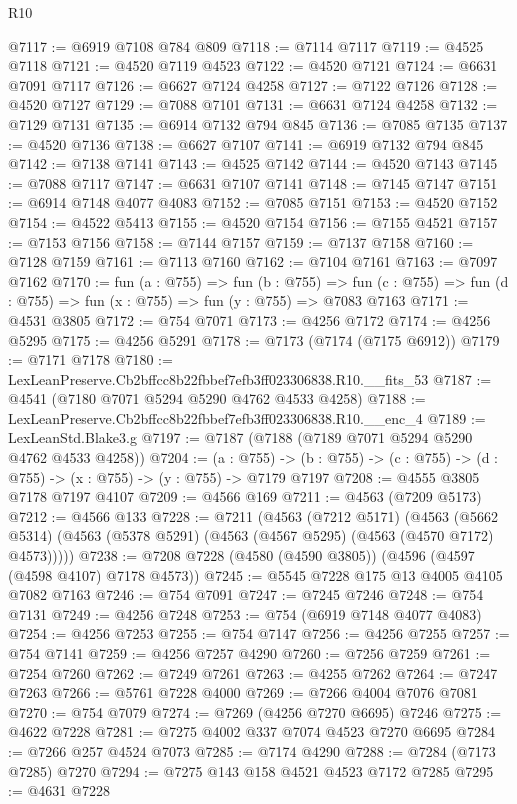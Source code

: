 \begin{lexlean}{R10}
\begin{coremodule}
@7117 := @6919 @7108 @784 @809
@7118 := @7114 @7117
@7119 := @4525 @7118
@7121 := @4520 @7119 @4523
@7122 := @4520 @7121
@7124 := @6631 @7091 @7117
@7126 := @6627 @7124 @4258
@7127 := @7122 @7126
@7128 := @4520 @7127
@7129 := @7088 @7101
@7131 := @6631 @7124 @4258
@7132 := @7129 @7131
@7135 := @6914 @7132 @794 @845
@7136 := @7085 @7135
@7137 := @4520 @7136
@7138 := @6627 @7107
@7141 := @6919 @7132 @794 @845
@7142 := @7138 @7141
@7143 := @4525 @7142
@7144 := @4520 @7143
@7145 := @7088 @7117
@7147 := @6631 @7107 @7141
@7148 := @7145 @7147
@7151 := @6914 @7148 @4077 @4083
@7152 := @7085 @7151
@7153 := @4520 @7152
@7154 := @4522 @5413
@7155 := @4520 @7154
@7156 := @7155 @4521
@7157 := @7153 @7156
@7158 := @7144 @7157
@7159 := @7137 @7158
@7160 := @7128 @7159
@7161 := @7113 @7160
@7162 := @7104 @7161
@7163 := @7097 @7162
@7170 := fun (a : @755) =>
  fun (b : @755) =>
  fun (c : @755) => fun (d : @755) => fun (x : @755) => fun (y : @755) => @7083 @7163
@7171 := @4531 @3805
@7172 := @754 @7071
@7173 := @4256 @7172
@7174 := @4256 @5295
@7175 := @4256 @5291
@7178 := @7173 (@7174 (@7175 @6912))
@7179 := @7171 @7178
@7180 := LexLeanPreserve.Cb2bffcc8b22fbbef7efb3ff023306838.R10.__fits_53
@7187 := @4541 (@7180 @7071 @5294 @5290 @4762 @4533 @4258)
@7188 := LexLeanPreserve.Cb2bffcc8b22fbbef7efb3ff023306838.R10.__enc_4
@7189 := LexLeanStd.Blake3.g
@7197 := @7187 (@7188 (@7189 @7071 @5294 @5290 @4762 @4533 @4258))
@7204 := (a : @755) ->
  (b : @755) -> (c : @755) -> (d : @755) -> (x : @755) -> (y : @755) -> @7179 @7197
@7208 := @4555 @3805 @7178 @7197 @4107
@7209 := @4566 @169
@7211 := @4563 (@7209 @5173)
@7212 := @4566 @133
@7228 := @7211
    (@4563
      (@7212 @5171)
      (@4563 (@5662 @5314) (@4563 (@5378 @5291) (@4563 (@4567 @5295) (@4563 (@4570 @7172) @4573)))))
@7238 := @7208 @7228 (@4580 (@4590 @3805)) (@4596 (@4597 (@4598 @4107) @7178 @4573))
@7245 := @5545 @7228 @175 @13 @4005 @4105 @7082 @7163
@7246 := @754 @7091
@7247 := @7245 @7246
@7248 := @754 @7131
@7249 := @4256 @7248
@7253 := @754 (@6919 @7148 @4077 @4083)
@7254 := @4256 @7253
@7255 := @754 @7147
@7256 := @4256 @7255
@7257 := @754 @7141
@7259 := @4256 @7257 @4290
@7260 := @7256 @7259
@7261 := @7254 @7260
@7262 := @7249 @7261
@7263 := @4255 @7262
@7264 := @7247 @7263
@7266 := @5761 @7228 @4000
@7269 := @7266 @4004 @7076 @7081
@7270 := @754 @7079
@7274 := @7269 (@4256 @7270 @6695) @7246
@7275 := @4622 @7228
@7281 := @7275 @4002 @337 @7074 @4523 @7270 @6695
@7284 := @7266 @257 @4524 @7073
@7285 := @7174 @4290
@7288 := @7284 (@7173 @7285) @7270
@7294 := @7275 @143 @158 @4521 @4523 @7172 @7285
@7295 := @4631 @7228

\end{coremodule}
\end{lexlean}
